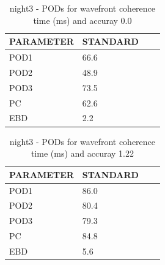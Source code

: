 \begin{table}[p!]
\begin{center}
\begin{tabular}{|l|l|l|l|}
\hline
\multicolumn{1}{|c|}{\cellcolor[HTML]{C0C0C0}\textbf{PARAMETER}} & \multicolumn{1}{c|}{\cellcolor[HTML]{C0C0C0}\textbf{STANDARD}} \\
\hline
\cellcolor[HTML]{C0C0C0}POD1  & 66.6                                \\
\cellcolor[HTML]{C0C0C0}POD2  & 48.9                                \\
\cellcolor[HTML]{C0C0C0}POD3  & 73.5                                \\
\cellcolor[HTML]{C0C0C0}PC    & 62.6                                  \\
\cellcolor[HTML]{C0C0C0}EBD   & 2.2                                 \\
\hline
\end{tabular}
\caption{night3 - PODs for wavefront coherence time (ms) and accuray 0.0}
\label{tab:podtau0.0:night3}
\end{center}
\end{table}
\begin{table}[p!]
\begin{center}
\begin{tabular}{|l|l|l|l|}
\hline
\multicolumn{1}{|c|}{\cellcolor[HTML]{C0C0C0}\textbf{PARAMETER}} & \multicolumn{1}{c|}{\cellcolor[HTML]{C0C0C0}\textbf{STANDARD}} \\
\hline
\cellcolor[HTML]{C0C0C0}POD1  & 86.0                                \\
\cellcolor[HTML]{C0C0C0}POD2  & 80.4                                \\
\cellcolor[HTML]{C0C0C0}POD3  & 79.3                                \\
\cellcolor[HTML]{C0C0C0}PC    & 84.8                                  \\
\cellcolor[HTML]{C0C0C0}EBD   & 5.6                                 \\
\hline
\end{tabular}
\caption{night3 - PODs for wavefront coherence time (ms) and accuray 1.22}
\label{tab:podtau1.22:night3}
\end{center}
\end{table}
